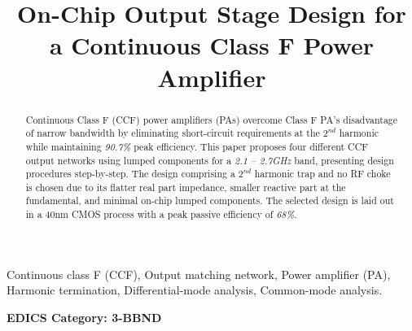 \documentclass[conference]{IEEEtran}
\begin{document}
\title{On-Chip Output Stage Design for a  Continuous Class F Power Amplifier}

\author{ 
}

\maketitle

\begin{abstract}
Continuous Class F (CCF) power amplifiers (PAs) overcome Class F PA's disadvantage of narrow bandwidth by eliminating short-circuit requirements at the $2^{nd}$ harmonic while maintaining \textit{90.7\%} peak efficiency. This paper proposes four different CCF output networks using lumped components for a \textit{2.1 -- 2.7GHz} band, presenting design procedures step-by-step. The design comprising a $2^{nd}$ harmonic trap and no RF choke is chosen due to its  flatter real part impedance, smaller reactive part at the fundamental, and  minimal on-chip lumped components. The selected design is laid out in a 40nm CMOS process with a peak passive efficiency of \textit{68\%}.
\end{abstract}

\vspace{1mm}
\begin{IEEEkeywords}
Continuous class F (CCF), Output matching network, Power amplifier (PA), Harmonic termination, Differential-mode analysis, Common-mode analysis. 
\end{IEEEkeywords}


\ifCLASSOPTIONpeerreview
\begin{center} \bfseries EDICS Category: 3-BBND \end{center}
\fi

\IEEEpeerreviewmaketitle
\end{document}
